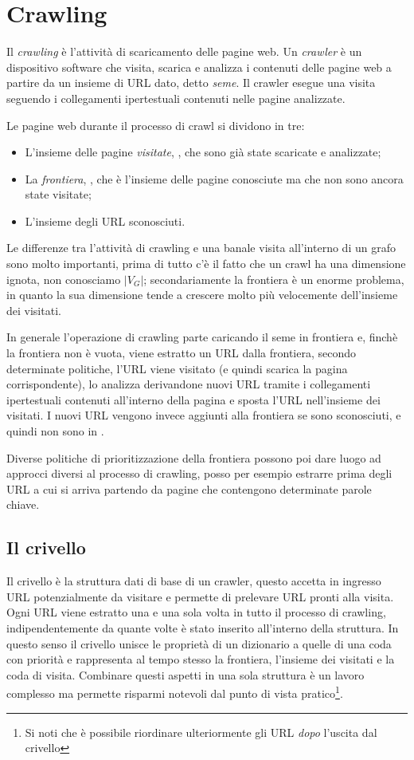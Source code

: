 \chapter{Crawling}
Il \textit{crawling} è l'attività di scaricamento delle pagine web. Un \textit{crawler} è un dispositivo software che visita, scarica e analizza i contenuti delle pagine web a partire da un insieme di URL dato, detto \textit{seme}. Il crawler esegue una visita seguendo i collegamenti ipertestuali contenuti nelle pagine analizzate.

Le pagine web durante il processo di crawl si dividono in tre:
\begin{itemize}
    \item L'insieme delle pagine \textit{visitate}, , che sono già state scaricate e analizzate;
    \item La \textit{frontiera}, , che è l'insieme delle pagine conosciute ma che non sono ancora state visitate;
    \item L'insieme  degli URL sconosciuti.
\end{itemize}
Le differenze tra l'attività di crawling e una banale visita all'interno di un grafo sono molto importanti, prima di tutto c'è il fatto che un crawl ha una dimensione ignota, non conosciamo $|V_G|$; secondariamente la frontiera è un enorme problema, in quanto la sua dimensione tende a crescere molto più velocemente dell'insieme dei visitati.

In generale l'operazione di crawling parte caricando il seme in frontiera e, finchè la frontiera non è vuota, viene estratto un URL dalla frontiera, secondo determinate politiche, l'URL viene visitato (e quindi scarica la pagina corrispondente), lo analizza derivandone nuovi URL tramite i collegamenti ipertestuali contenuti all'interno della pagina e sposta l'URL nell'insieme dei visitati. I nuovi URL vengono invece aggiunti alla frontiera se sono sconosciuti, e quindi non sono in .

Diverse politiche di prioritizzazione della frontiera possono poi dare luogo ad approcci diversi al processo di crawling, posso per esempio estrarre prima degli URL a cui si arriva partendo da pagine che contengono determinate parole chiave.
\section{Il crivello}
Il crivello è la struttura dati di base di un crawler, questo accetta in ingresso URL potenzialmente da visitare e permette di prelevare URL pronti alla visita. Ogni URL viene estratto una e una sola volta in tutto il processo di crawling, indipendentemente da quante volte è stato inserito all'interno della struttura. In questo senso il crivello unisce le proprietà di un dizionario a quelle di una coda con priorità e rappresenta al tempo stesso la frontiera, l'insieme dei visitati e la coda di visita. Combinare questi aspetti in una sola struttura è un lavoro complesso ma permette risparmi notevoli dal punto di vista pratico\footnote{Si noti che è possibile riordinare ulteriormente gli URL \textit{dopo} l'uscita dal crivello}.

